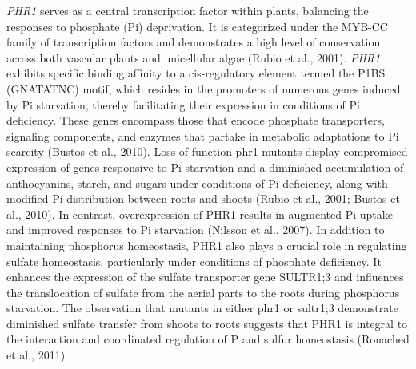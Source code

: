 \documentclass[10pt,letterpaper]{article}
\begin{document}
\textit{PHR1} serves as a central transcription factor within plants, balancing the responses to phosphate (Pi) deprivation. It is categorized under the MYB-CC family of transcription factors and demonstrates a high level of conservation across both vascular plants and unicellular algae (Rubio et al., 2001). \textit{PHR1} exhibits specific binding affinity to a cis-regulatory element termed the P1BS (GNATATNC) motif, which resides in the promoters of numerous genes induced by Pi starvation, thereby facilitating their expression in conditions of Pi deficiency. These genes encompass those that encode phosphate transporters, signaling components, and enzymes that partake in metabolic adaptations to Pi scarcity (Bustos et al., 2010). Loss-of-function phr1 mutants display compromised expression of genes responsive to Pi starvation and a diminished accumulation of anthocyanins, starch, and sugars under conditions of Pi deficiency, along with modified Pi distribution between roots and shoots (Rubio et al., 2001; Bustos et al., 2010). In contrast, overexpression of PHR1 results in augmented Pi uptake and improved responses to Pi starvation (Nilsson et al., 2007). In addition to maintaining phosphorus homeostasis, PHR1 also plays a crucial role in regulating sulfate homeostasis, particularly under conditions of phosphate deficiency. It enhances the expression of the sulfate transporter gene SULTR1;3 and influences the translocation of sulfate from the aerial parts to the roots during phosphorus starvation. The observation that mutants in either phr1 or sultr1;3 demonstrate diminished sulfate transfer from shoots to roots suggests that PHR1 is integral to the interaction and coordinated regulation of P and sulfur homeostasis (Rouached et al., 2011). 
\end{document}
